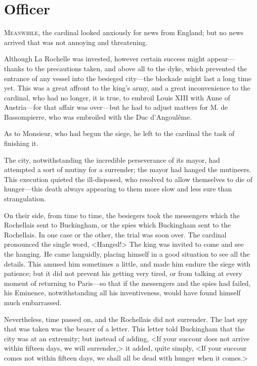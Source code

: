 
\chapter{Officer}

\lettrine[]{M}{eanwhile,} the cardinal looked anxiously for news from England; but no news arrived that was not annoying and threatening. 

\zz
Although La Rochelle was invested, however certain success might appear---thanks to the precautions taken, and above all to the dyke, which prevented the entrance of any vessel into the besieged city---the blockade might last a long time yet. This was a great affront to the king's army, and a great inconvenience to the cardinal, who had no longer, it is true, to embroil Louis XIII with Anne of Austria---for that affair was over---but he had to adjust matters for M. de Bassompierre, who was embroiled with the Duc d'Angoulême. 

As to Monsieur, who had begun the siege, he left to the cardinal the task of finishing it. 

The city, notwithstanding the incredible perseverance of its mayor, had attempted a sort of mutiny for a surrender; the mayor had hanged the mutineers. This execution quieted the ill-disposed, who resolved to allow themselves to die of hunger---this death always appearing to them more slow and less sure than strangulation. 

On their side, from time to time, the besiegers took the messengers which the Rochellais sent to Buckingham, or the spies which Buckingham sent to the Rochellais. In one case or the other, the trial was soon over. The cardinal pronounced the single word, <Hanged!> The king was invited to come and see the hanging. He came languidly, placing himself in a good situation to see all the details. This amused him sometimes a little, and made him endure the siege with patience; but it did not prevent his getting very tired, or from talking at every moment of returning to Paris---so that if the messengers and the spies had failed, his Eminence, notwithstanding all his inventiveness, would have found himself much embarrassed. 

Nevertheless, time passed on, and the Rochellais did not surrender. The last spy that was taken was the bearer of a letter. This letter told Buckingham that the city was at an extremity; but instead of adding, <If your succour does not arrive within fifteen days, we will surrender,> it added, quite simply, <If your succour comes not within fifteen days, we shall all be dead with hunger when it comes.> 

